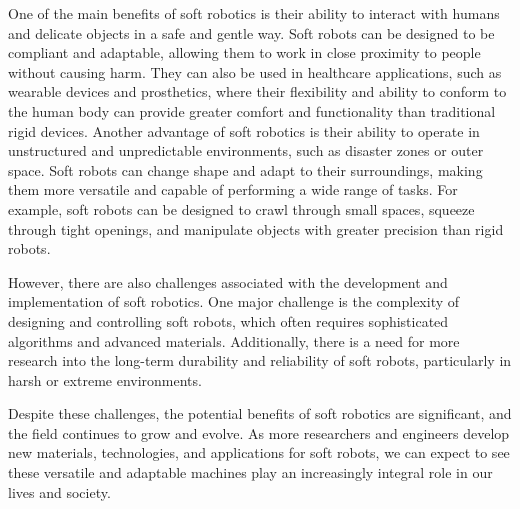 One of the main benefits of soft robotics is their ability to interact with humans and delicate objects in a safe and gentle way. Soft robots can be designed to be compliant and adaptable, allowing them to work in close proximity to people without causing harm. They can also be used in healthcare applications, such as wearable devices and prosthetics, where their flexibility and ability to conform to the human body can provide greater comfort and functionality than traditional rigid devices. Another advantage of soft robotics is their ability to operate in unstructured and unpredictable environments, such as disaster zones or outer space. Soft robots can change shape and adapt to their surroundings, making them more versatile and capable of performing a wide range of tasks. For example, soft robots can be designed to crawl through small spaces, squeeze through tight openings, and manipulate objects with greater precision than rigid robots.

However, there are also challenges associated with the development and implementation of soft robotics. One major challenge is the complexity of designing and controlling soft robots, which often requires sophisticated algorithms and advanced materials. Additionally, there is a need for more research into the long-term durability and reliability of soft robots, particularly in harsh or extreme environments.

Despite these challenges, the potential benefits of soft robotics are significant, and the field continues to grow and evolve. As more researchers and engineers develop new materials, technologies, and applications for soft robots, we can expect to see these versatile and adaptable machines play an increasingly integral role in our lives and society.
